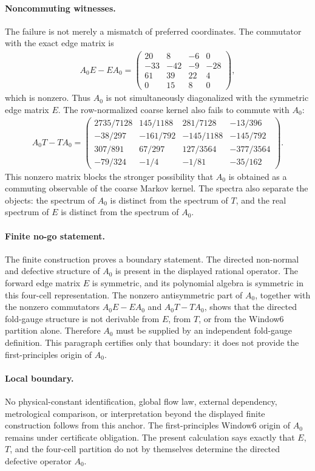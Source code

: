 \paragraph{Noncommuting witnesses.}
The failure is not merely a mismatch of preferred coordinates.  The commutator with the exact edge matrix is
$$
\begin{aligned}
A_0E-EA_0=
\begin{pmatrix}
20&8&-6&0\\
-33&-42&-9&-28\\
61&39&22&4\\
0&15&8&0
\end{pmatrix},
\end{aligned}
$$
which is nonzero.  Thus $A_0$ is not simultaneously diagonalized with the symmetric edge matrix $E$.  The row-normalized coarse kernel also fails to commute with $A_0$:
$$
\begin{aligned}
A_0T-TA_0=
\begin{pmatrix}
2735/7128&145/1188&281/7128&-13/396\\
-38/297&-161/792&-145/1188&-145/792\\
307/891&67/297&127/3564&-377/3564\\
-79/324&-1/4&-1/81&-35/162
\end{pmatrix}.
\end{aligned}
$$
This nonzero matrix blocks the stronger possibility that $A_0$ is obtained as a commuting observable of the coarse Markov kernel.  The spectra also separate the objects: the spectrum of $A_0$ is distinct from the spectrum of $T$, and the real spectrum of $E$ is distinct from the spectrum of $A_0$.

\paragraph{Finite no-go statement.}
The finite construction proves a boundary statement.  The directed non-normal and defective structure of $A_0$ is present in the displayed rational operator.  The forward edge matrix $E$ is symmetric, and its polynomial algebra is symmetric in this four-cell representation.  The nonzero antisymmetric part of $A_0$, together with the nonzero commutators $A_0E-EA_0$ and $A_0T-TA_0$, shows that the directed fold-gauge structure is not derivable from $E$, from $T$, or from the Window6 partition alone.  Therefore $A_0$ must be supplied by an independent fold-gauge definition.  This paragraph certifies only that boundary: it does not provide the first-principles origin of $A_0$.

\paragraph{Local boundary.}
No physical-constant identification, global flow law, external dependency, metrological comparison, or interpretation beyond the displayed finite construction follows from this anchor.  The first-principles Window6 origin of $A_0$ remains under certificate obligation.  The present calculation says exactly that $E$, $T$, and the four-cell partition do not by themselves determine the directed defective operator $A_0$.
